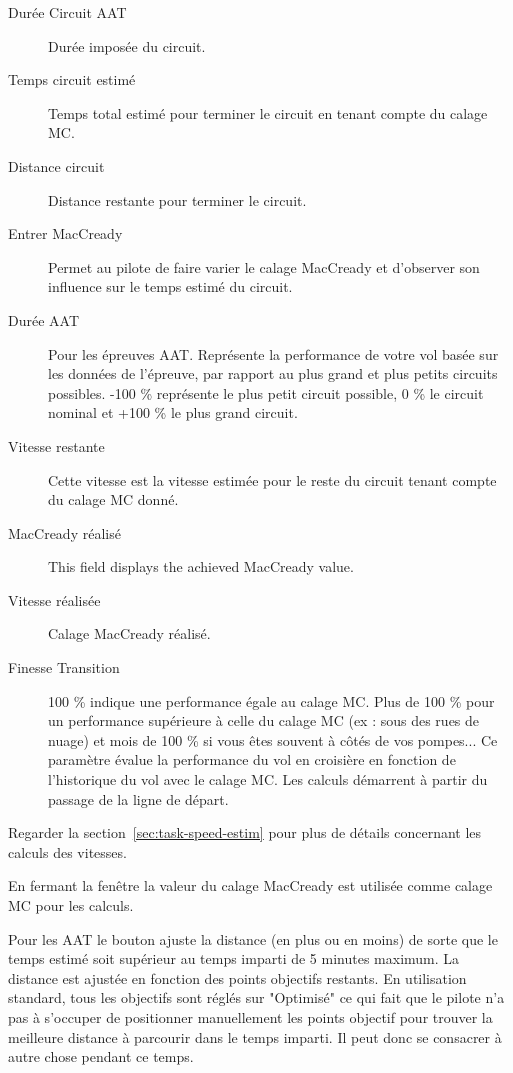 \begin{description}
\item[Durée Circuit AAT]  Durée imposée du circuit.
\item[Temps circuit estimé]  Temps total estimé pour terminer le circuit en tenant compte du calage MC.
\item[Distance circuit]  Distance restante pour terminer le circuit.
\item[Entrer MacCready]  Permet au pilote de faire varier le calage MacCready et d'observer son influence sur le temps estimé du circuit.
\item[Durée AAT]  Pour les épreuves AAT. Représente la performance de votre vol basée sur les données de l'épreuve, par rapport au plus grand et plus petits circuits possibles. -100 \% représente le plus petit circuit possible, 0 \% le circuit nominal et +100 \% le plus grand circuit.
\item[Vitesse restante]  Cette vitesse est la vitesse estimée pour le reste du circuit tenant compte du calage MC donné.
\item[MacCready réalisé]  This field displays the achieved MacCready value.
\item[Vitesse réalisée]  Calage MacCready réalisé.
\item[Finesse Transition]  100 \% indique une performance égale au calage MC. Plus de 100 \% pour un performance supérieure à celle du calage MC (ex : sous des rues de nuage) et mois de 100 \% si vous êtes souvent à côtés de vos pompes... Ce paramètre évalue la performance du vol en croisière en fonction de l'historique du vol avec le calage MC. Les calculs démarrent à partir du passage de la ligne de départ.
\end{description}
Regarder la section~\ref{sec:task-speed-estim} pour plus de détails concernant les calculs des vitesses.

En fermant la fenêtre la valeur du calage MacCready est utilisée comme calage MC pour les calculs. 

Pour les AAT le bouton  ajuste la distance (en plus ou en moins) de sorte que le temps estimé soit supérieur au temps imparti de 5 minutes maximum. La distance est ajustée en fonction des points objectifs restants. En utilisation standard, tous les objectifs sont réglés sur "Optimisé" ce qui fait que le pilote n'a pas à s'occuper de positionner manuellement les points objectif pour trouver la meilleure distance à parcourir dans le temps imparti. Il peut donc se consacrer à autre chose pendant ce temps.



